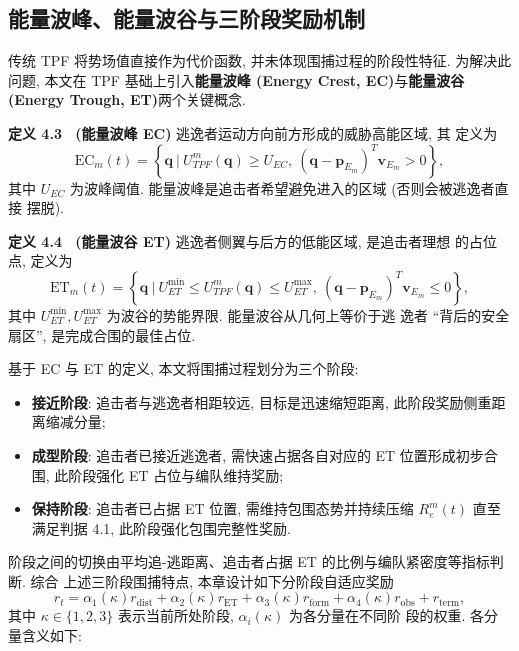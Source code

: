 \subsection{能量波峰、能量波谷与三阶段奖励机制}
\label{subsec:ec_et}
传统 TPF 将势场值直接作为代价函数, 并未体现围捕过程的阶段性特征. 为解决此问题,
本文在 TPF 基础上引入\textbf{能量波峰 (Energy Crest, EC)}与\textbf{能量波谷
(Energy Trough, ET)}两个关键概念.

\textbf{定义 4.3 \ (能量波峰 EC)} \quad 逃逸者运动方向前方形成的威胁高能区域, 其
定义为
\begin{equation}
\mathrm{EC}_m(t) = \left\{ \mathbf{q}\ \Big|\ U_{TPF}^{m}(\mathbf{q}) \ge U_{EC},\ (\mathbf{q}-\mathbf{p}_{E_m})^T \mathbf{v}_{E_m} > 0 \right\},
\label{eq:ec}
\end{equation}
其中 $U_{EC}$ 为波峰阈值. 能量波峰是追击者希望避免进入的区域 (否则会被逃逸者直接
摆脱).

\textbf{定义 4.4 \ (能量波谷 ET)} \quad 逃逸者侧翼与后方的低能区域, 是追击者理想
的占位点, 定义为
\begin{equation}
\mathrm{ET}_m(t) = \left\{ \mathbf{q}\ \Big|\ U_{ET}^{\min} \le U_{TPF}^{m}(\mathbf{q}) \le U_{ET}^{\max},\ (\mathbf{q}-\mathbf{p}_{E_m})^T\mathbf{v}_{E_m} \le 0 \right\},
\label{eq:et}
\end{equation}
其中 $U_{ET}^{\min}, U_{ET}^{\max}$ 为波谷的势能界限. 能量波谷从几何上等价于逃
逸者 ``背后的安全扇区'', 是完成合围的最佳占位.

基于 EC 与 ET 的定义, 本文将围捕过程划分为三个阶段:
\begin{itemize}
  \item \textbf{接近阶段}: 追击者与逃逸者相距较远, 目标是迅速缩短距离, 此阶段奖励侧重距离缩减分量;
  \item \textbf{成型阶段}: 追击者已接近逃逸者, 需快速占据各自对应的 ET 位置形成初步合围, 此阶段强化 ET 占位与编队维持奖励;
  \item \textbf{保持阶段}: 追击者已占据 ET 位置, 需维持包围态势并持续压缩 $R_e^m(t)$ 直至满足判据 4.1, 此阶段强化包围完整性奖励.
\end{itemize}
阶段之间的切换由平均追-逃距离、追击者占据 ET 的比例与编队紧密度等指标判断. 综合
上述三阶段围捕特点, 本章设计如下分阶段自适应奖励
\begin{equation}
r_t = \alpha_1(\kappa) r_{\mathrm{dist}} + \alpha_2(\kappa) r_{\mathrm{ET}} + \alpha_3(\kappa) r_{\mathrm{form}} + \alpha_4(\kappa) r_{\mathrm{obs}} + r_{\mathrm{term}},
\label{eq:hunt_reward}
\end{equation}
其中 $\kappa\in\{1,2,3\}$ 表示当前所处阶段, $\alpha_i(\kappa)$ 为各分量在不同阶
段的权重. 各分量含义如下:

